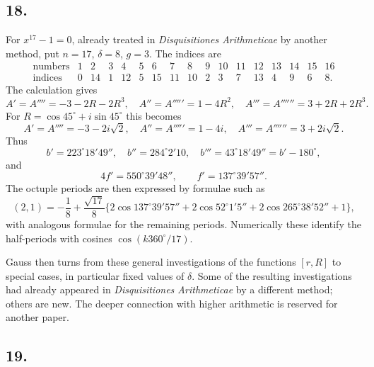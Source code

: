 \documentclass[12pt]{article}
\begin{document}
\subsection*{18.}

For $x^{17}-1=0$, already treated in \emph{Disquisitiones Arithmeticae} by another method, put $n=17$, $\delta=8$, $g=3$. The indices are
\[
\begin{array}{c|cccccccccccccccc}
\text{numbers}&1&2&3&4&5&6&7&8&9&10&11&12&13&14&15&16\\
\text{indices}&0&14&1&12&5&15&11&10&2&3&7&13&4&9&6&8.
\end{array}
\]
The calculation gives
\[
A'=A''''=-3-2R-2R^3,\quad
A''=A'''''=1-4R^2,\quad
A'''=A''''''=3+2R+2R^3.
\]
For $R=\cos45^\circ+i\sin45^\circ$ this becomes
\[
A'=A''''=-3-2i\sqrt2,\quad A''=A'''''=1-4i,\quad A'''=A''''''=3+2i\sqrt2.
\]
Thus
\[
b'=223^\circ18'49'',\quad b''=284^\circ2'10,\quad b'''=43^\circ18'49''=b'-180^\circ,
\]
and
\[
4f'=550^\circ39'48'',\qquad f'=137^\circ39'57''.
\]
The octuple periods are then expressed by formulae such as
\[
(2,1)=-\frac18+\frac{\sqrt{17}}8\{2\cos137^\circ39'57''+2\cos52^\circ1'5''+2\cos265^\circ38'52''+1\},
\]
with analogous formulae for the remaining periods. Numerically these identify the half-periods with cosines $\cos(k360^\circ/17)$.

Gauss then turns from these general investigations of the functions $[r,R]$ to special cases, in particular fixed values of $\delta$. Some of the resulting investigations had already appeared in \emph{Disquisitiones Arithmeticae} by a different method; others are new. The deeper connection with higher arithmetic is reserved for another paper.

\subsection*{19.}
\end{document}
